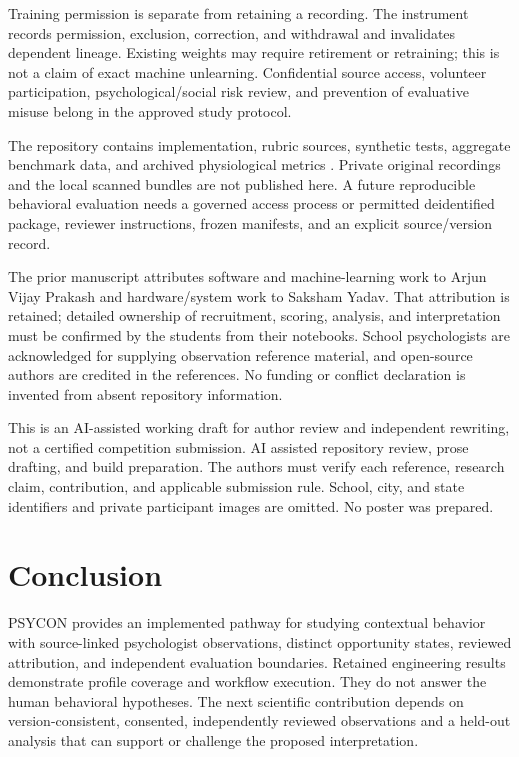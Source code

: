 \documentclass{article}
\begin{document}
Training permission is separate from retaining a recording. The instrument records permission, exclusion, correction, and withdrawal and invalidates dependent lineage. Existing weights may require retirement or retraining; this is not a claim of exact machine unlearning. Confidential source access, volunteer participation, psychological/social risk review, and prevention of evaluative misuse belong in the approved study protocol.

The repository contains implementation, rubric sources, synthetic tests, aggregate benchmark data, and archived physiological metrics \cite{psyconrepo}. Private original recordings and the local scanned bundles are not published here. A future reproducible behavioral evaluation needs a governed access process or permitted deidentified package, reviewer instructions, frozen manifests, and an explicit source/version record.

The prior manuscript attributes software and machine-learning work to Arjun Vijay Prakash and hardware/system work to Saksham Yadav. That attribution is retained; detailed ownership of recruitment, scoring, analysis, and interpretation must be confirmed by the students from their notebooks. School psychologists are acknowledged for supplying observation reference material, and open-source authors are credited in the references. No funding or conflict declaration is invented from absent repository information.

This is an AI-assisted working draft for author review and independent rewriting, not a certified competition submission. AI assisted repository review, prose drafting, and build preparation. The authors must verify each reference, research claim, contribution, and applicable submission rule. School, city, and state identifiers and private participant images are omitted. No poster was prepared.

\section{Conclusion}
PSYCON provides an implemented pathway for studying contextual behavior with source-linked psychologist observations, distinct opportunity states, reviewed attribution, and independent evaluation boundaries. Retained engineering results demonstrate profile coverage and workflow execution. They do not answer the human behavioral hypotheses. The next scientific contribution depends on version-consistent, consented, independently reviewed observations and a held-out analysis that can support or challenge the proposed interpretation.
\end{document}
